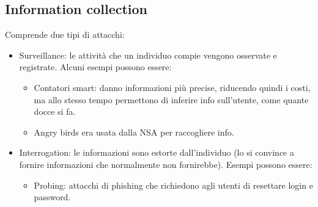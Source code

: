 \subsection{Information collection}
Comprende due tipi di attacchi:
\begin{itemize}
    \item Surveillance: le attività che un individuo compie vengono osservate e registrate. Alcuni esempi possono essere:
    \begin{itemize}
        \item Contatori smart: danno informazioni più precise, riducendo quindi i costi, ma allo stesso tempo permettono di inferire info sull'utente, come quante docce si fa.
        \item Angry birds era usata dalla NSA per raccogliere info.
    \end{itemize}
    \item Interrogation: le informazioni sono estorte dall'individuo (lo si convince a fornire informazioni che normalmente non fornirebbe). Esempi possono essere:
    \begin{itemize}
        \item Probing: attacchi di phishing che richiedono agli utenti di resettare login e password.
    \end{itemize}
\end{itemize}


